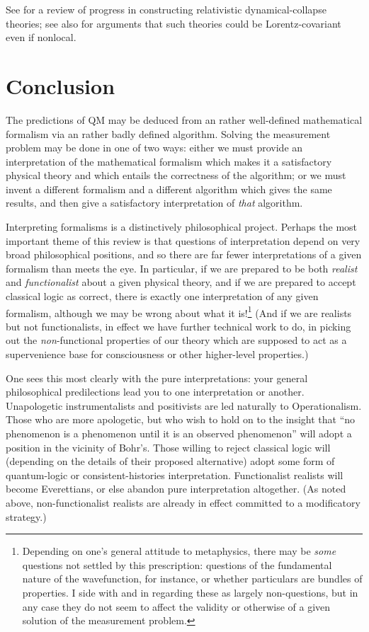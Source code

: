 \documentclass[12pt]{article}
\begin{document}
See  for a review of progress in constructing relativistic dynamical-collapse theories; see also  for arguments that such theories could be Lorentz-covariant even if nonlocal.


\section{Conclusion}\label{DMWWconclusion}

The predictions of QM may be deduced from an rather well-defined mathematical formalism via an rather badly defined algorithm. Solving the measurement problem may be done in one of two ways: either we must provide an interpretation of the mathematical formalism which makes it a satisfactory physical theory and which entails the correctness of the algorithm; or we must invent a different formalism and a different algorithm which gives the same results, and then give a satisfactory interpretation of \emph{that} algorithm.



Interpreting formalisms is a distinctively philosophical project. Perhaps the most important theme of this review is that questions of interpretation depend on very broad philosophical positions, and so there are far fewer interpretations of a given formalism than meets the eye. In particular, if we are prepared to be both \emph{realist} and \emph{functionalist} about a given physical theory, and if we are prepared to accept classical logic as correct, there is exactly one interpretation of any given formalism, although we may be wrong about what it is!\footnote{Depending on one's general attitude to metaphysics, there may be \emph{some} questions not settled by this prescription: questions of the fundamental nature of the wavefunction, for instance, or whether particulars are bundles of properties. I side with  and  in regarding these as largely non-questions, but in any case they do not seem to affect the validity or otherwise of a given solution of the measurement problem.} (And if we are realists but not functionalists, in effect we have further technical work to do, in picking out the \emph{non}-functional properties of our theory which are supposed to act as a supervenience base for consciousness or other higher-level properties.)

One sees this most clearly with the pure interpretations: your  general philosophical predilections lead you to one interpretation or another. Unapologetic instrumentalists and positivists are led naturally to Operationalism. Those who are more apologetic, but who wish to hold on to the insight that ``no phenomenon is a phenomenon until it is an observed phenomenon'' will adopt a position in the vicinity of Bohr's. Those willing to reject classical logic will (depending on the details of their proposed alternative) adopt some form of quantum-logic or consistent-histories interpretation. Functionalist realists will become Everettians, or else abandon pure interpretation altogether. (As noted above, non-functionalist realists are already in effect committed to a modificatory strategy.) 
\end{document}
